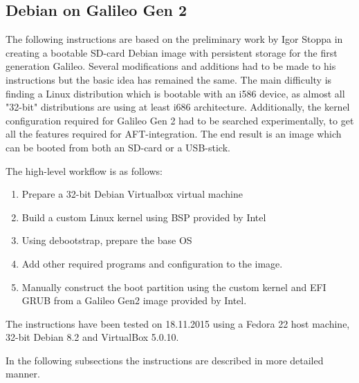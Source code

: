 \documentclass[a4paper,11pt]{article}
\begin{document}
\subsection{Debian on Galileo Gen 2}

The following instructions are based on the preliminary work by Igor Stoppa in creating a bootable SD-card Debian image with persistent storage for the first generation Galileo. Several modifications and additions had to be made to his instructions but the basic idea has remained the same. The main difficulty is finding a Linux distribution which is bootable with an i586 device, as almost all "32-bit" distributions are using at least i686 architecture. Additionally, the kernel configuration required for Galileo Gen 2 had to be searched experimentally, to get all the features required for AFT-integration. The end result is an image which can be booted from both an SD-card or a USB-stick.

The high-level workflow is as follows:
\begin{enumerate}
\label{galileodebianhighlevel}
\item Prepare a 32-bit Debian Virtualbox virtual machine
\item Build a custom Linux kernel using BSP provided by Intel
\item Using debootstrap, prepare the base OS
\item Add other required programs and configuration to the image.
\item Manually construct the boot partition using the custom kernel and EFI GRUB from a Galileo Gen2 image provided by Intel.
\end{enumerate}

The instructions have been tested on 18.11.2015 using a Fedora 22 host machine, 32-bit Debian 8.2 and VirtualBox 5.0.10.

In the following subsections the instructions are described in more detailed manner.
\end{document}
